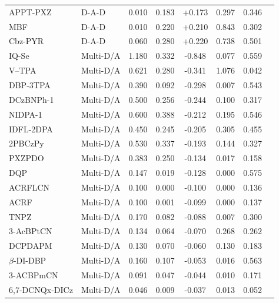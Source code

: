 \begin{longtable}{llcccccc}
APPT-PXZ & D-A-D & 0.010 & 0.183 & +0.173 & 0.297 & 0.346 & \cite{doi101016jdyepig2021109474} \\
MBF & D-A-D & 0.010 & 0.220 & +0.210 & 0.843 & 0.302 & \cite{doi101016jdyepig2021109392} \\
Cbz-PYR & D-A-D & 0.060 & 0.280 & +0.220 & 0.738 & 0.501 & \cite{doi101016jdyepig2022110157} \\
IQ-Se & Multi-D/A & 1.180 & 0.332 & -0.848 & 0.077 & 0.559 & \cite{doi101039D1CC06380D} \\
V--TPA & Multi-D/A & 0.621 & 0.280 & -0.341 & 1.076 & 0.042 & \cite{doi101039D2PY01306A} \\
DBP-3TPA & Multi-D/A & 0.390 & 0.092 & -0.298 & 0.007 & 0.543 & \cite{doi101016jdyepig2019107957} \\
DCzBNPh-1 & Multi-D/A & 0.500 & 0.256 & -0.244 & 0.100 & 0.317 & \cite{doi101016jorgel2022106445} \\
NIDPA-1 & Multi-D/A & 0.600 & 0.388 & -0.212 & 0.195 & 0.546 & \cite{doi101039D0TC01268H} \\
IDFL-2DPA & Multi-D/A & 0.450 & 0.245 & -0.205 & 0.305 & 0.455 & \cite{doi101016jcej2020125125} \\
2PBCzPy & Multi-D/A & 0.530 & 0.337 & -0.193 & 0.144 & 0.327 & \cite{doi101016jorgel201710015} \\
PXZPDO & Multi-D/A & 0.383 & 0.250 & -0.134 & 0.017 & 0.158 & \cite{doi101039D1TC00002K} \\
DQP & Multi-D/A & 0.147 & 0.019 & -0.128 & 0.000 & 0.575 & \cite{doi101039D1TC05906H} \\
ACRFLCN & Multi-D/A & 0.100 & 0.000 & -0.100 & 0.000 & 0.136 & \cite{doi101039D0TC00743A} \\
ACRF & Multi-D/A & 0.100 & 0.001 & -0.099 & 0.000 & 0.137 & \cite{doi101039D0TC00743A} \\
TNPZ & Multi-D/A & 0.170 & 0.082 & -0.088 & 0.007 & 0.300 & \cite{doi101039D2SC06335B} \\
3-AcBPtCN & Multi-D/A & 0.134 & 0.064 & -0.070 & 0.268 & 0.262 & \cite{doi101016jcej2021134216} \\
DCPDAPM & Multi-D/A & 0.130 & 0.070 & -0.060 & 0.130 & 0.183 & \cite{doi101039C7TC04934J} \\
$\beta$-DI-DBP & Multi-D/A & 0.160 & 0.107 & -0.053 & 0.016 & 0.563 & \cite{doi101016jdyepig2021109580} \\
3-ACBPmCN & Multi-D/A & 0.091 & 0.047 & -0.044 & 0.010 & 0.171 & \cite{doi101016jcej2021134216} \\
6,7-DCNQx-DICz & Multi-D/A & 0.046 & 0.009 & -0.037 & 0.013 & 0.052 & \cite{doi101039D0TC04465B} \\

\end{longtable}
